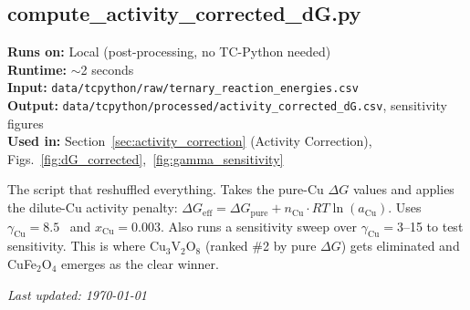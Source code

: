 \documentclass[11pt]{article}
\begin{document}


\cleardoublepage
\subsection{compute\_activity\_corrected\_dG.py}
\label{script:activity_corrected}

\textbf{Runs on:} Local (post-processing, no TC-Python needed)\\
\textbf{Runtime:} $\sim$2 seconds\\
\textbf{Input:} \texttt{data/tcpython/raw/ternary\_reaction\_energies.csv}\\
\textbf{Output:} \texttt{data/tcpython/processed/activity\_corrected\_dG.csv}, sensitivity figures\\
\textbf{Used in:} Section~\ref{sec:activity_correction} (Activity Correction), Figs.~\ref{fig:dG_corrected},~\ref{fig:gamma_sensitivity}

The script that reshuffled everything. Takes the pure-Cu $\Delta G$ values and applies the dilute-Cu activity penalty: $\Delta G_{\text{eff}} = \Delta G_{\text{pure}} + n_{\text{Cu}} \cdot RT\ln(a_{\text{Cu}})$. Uses $\gamma_{\text{Cu}} = 8.5$~\cite{Hino2010} and $x_{\text{Cu}} = 0.003$. Also runs a sensitivity sweep over $\gamma_{\text{Cu}} = 3$--15 to test sensitivity. This is where Cu$_3$V$_2$O$_8$ (ranked \#2 by pure $\Delta G$) gets eliminated and CuFe$_2$O$_4$ emerges as the clear winner.




\vfill
\begin{center}
\textit{Last updated: \today}
\end{center}
\end{document}
